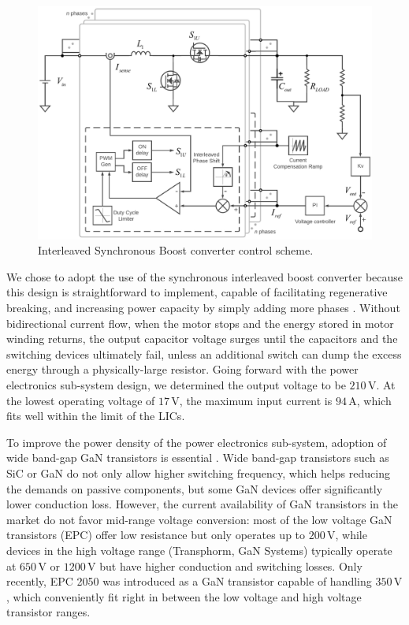     \begin{figure}
      \centering
      \includegraphics[width=5.5in]{appA/images/Interleaved_control_scheme_v6.pdf}
      \caption{Interleaved Synchronous Boost converter control scheme.}
      \label{fig:interleaved_boost_controller}
    \end{figure}
    
    We chose to adopt the use of the synchronous interleaved boost converter because this design is straightforward to implement, capable of facilitating regenerative breaking, and increasing power capacity by simply adding more phases \cite{Jin2016}. Without bidirectional current flow, when the motor stops and the energy stored in motor winding returns, the output capacitor voltage surges until the capacitors and the switching devices ultimately fail, unless an additional switch can dump the excess energy through a physically-large resistor. Going forward with the power electronics sub-system design, we determined the output voltage to be $210\,\mathrm{V}$. At the lowest operating voltage of $17\,\mathrm{V}$, the maximum input current is $94\,\mathrm{A}$, which fits well within the limit of the LICs.
    
    To improve the power density of the power electronics sub-system, adoption of wide band-gap GaN transistors is essential \cite{Huang2016}. Wide band-gap transistors such as SiC or GaN do not only allow higher switching frequency, which helps reducing the demands on passive components, but some GaN devices offer significantly lower conduction loss. However, the current availability of GaN transistors in the market do not favor mid-range voltage conversion: most of the low voltage GaN transistors (EPC) offer low resistance but only operates up to $200\,\mathrm{V}$, while devices in the high voltage range (Transphorm, GaN Systems) typically operate at $650\,\mathrm{V}$ or $1200\,\mathrm{V}$ but have higher conduction and switching losses. Only recently, EPC 2050 was introduced as a GaN transistor capable of handling $350\,\mathrm{V}$, which conveniently fit right in between the low voltage and high voltage transistor ranges. 
    
